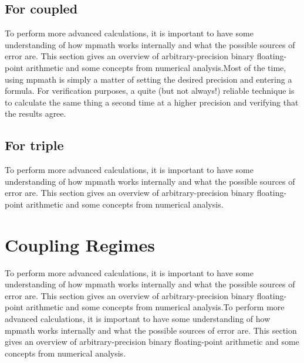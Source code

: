 \subsection{For coupled}
To perform more advanced calculations, it is important to have some understanding of how mpmath works internally and what the possible sources of error are. This section gives an overview of arbitrary-precision binary floating-point arithmetic and some concepts from numerical analysis.Most of the time, using mpmath is simply a matter of setting the desired precision and entering a formula. For verification purposes, a quite (but not always!) reliable technique is to calculate the same thing a second time at a higher precision and verifying that the results agree.
\subsection{For triple}
To perform more advanced calculations, it is important to have some understanding of how mpmath works internally and what the possible sources of error are. This section gives an overview of arbitrary-precision binary floating-point arithmetic and some concepts from numerical analysis.

\section{Coupling Regimes}
To perform more advanced calculations, it is important to have some understanding of how mpmath works internally and what the possible sources of error are. This section gives an overview of arbitrary-precision binary floating-point arithmetic and some concepts from numerical analysis.To perform more advanced calculations, it is important to have some understanding of how mpmath works internally and what the possible sources of error are. This section gives an overview of arbitrary-precision binary floating-point arithmetic and some concepts from numerical analysis.